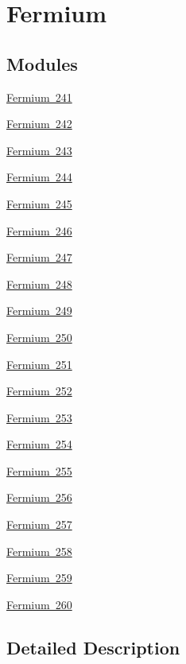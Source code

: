 \hypertarget{group___isotope_const-_fermium}{}\section{Fermium}
\label{group___isotope_const-_fermium}
\subsection*{Modules}
\begin{DoxyCompactItemize}
\item 
\mbox{\hyperlink{group___isotope_const-_fermium-_fm241}{Fermium 241}}
\item 
\mbox{\hyperlink{group___isotope_const-_fermium-_fm242}{Fermium 242}}
\item 
\mbox{\hyperlink{group___isotope_const-_fermium-_fm243}{Fermium 243}}
\item 
\mbox{\hyperlink{group___isotope_const-_fermium-_fm244}{Fermium 244}}
\item 
\mbox{\hyperlink{group___isotope_const-_fermium-_fm245}{Fermium 245}}
\item 
\mbox{\hyperlink{group___isotope_const-_fermium-_fm246}{Fermium 246}}
\item 
\mbox{\hyperlink{group___isotope_const-_fermium-_fm247}{Fermium 247}}
\item 
\mbox{\hyperlink{group___isotope_const-_fermium-_fm248}{Fermium 248}}
\item 
\mbox{\hyperlink{group___isotope_const-_fermium-_fm249}{Fermium 249}}
\item 
\mbox{\hyperlink{group___isotope_const-_fermium-_fm250}{Fermium 250}}
\item 
\mbox{\hyperlink{group___isotope_const-_fermium-_fm251}{Fermium 251}}
\item 
\mbox{\hyperlink{group___isotope_const-_fermium-_fm252}{Fermium 252}}
\item 
\mbox{\hyperlink{group___isotope_const-_fermium-_fm253}{Fermium 253}}
\item 
\mbox{\hyperlink{group___isotope_const-_fermium-_fm254}{Fermium 254}}
\item 
\mbox{\hyperlink{group___isotope_const-_fermium-_fm255}{Fermium 255}}
\item 
\mbox{\hyperlink{group___isotope_const-_fermium-_fm256}{Fermium 256}}
\item 
\mbox{\hyperlink{group___isotope_const-_fermium-_fm257}{Fermium 257}}
\item 
\mbox{\hyperlink{group___isotope_const-_fermium-_fm258}{Fermium 258}}
\item 
\mbox{\hyperlink{group___isotope_const-_fermium-_fm259}{Fermium 259}}
\item 
\mbox{\hyperlink{group___isotope_const-_fermium-_fm260}{Fermium 260}}
\end{DoxyCompactItemize}


\subsection{Detailed Description}
